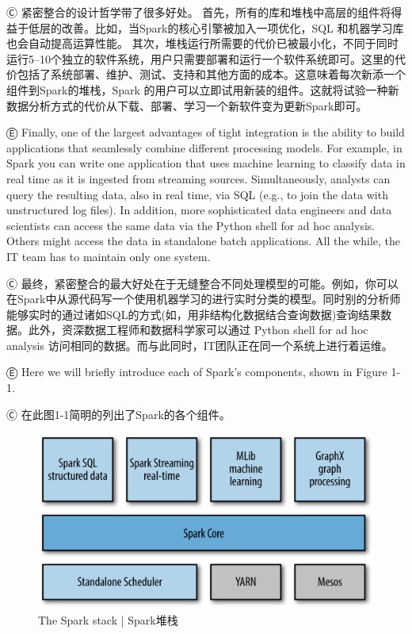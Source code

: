 Ⓒ 紧密整合的设计哲学带了很多好处。 首先，所有的库和堆栈中高层的组件将得益于低层的改善。比如，当Spark的核心引擎被加入一项优化，SQL 和机器学习库也会自动提高运算性能。 其次，堆栈运行所需要的代价已被最小化，不同于同时运行5--10个独立的软件系统，用户只需要部署和运行一个软件系统即可。这里的代价包括了系统部署、维护、测试、支持和其他方面的成本。这意味着每次新添一个组件到Spark的堆栈，Spark 的用户可以立即试用新装的组件。这就将试验一种新数据分析方式的代价从下载、部署、学习一个新软件变为更新Spark即可。

Ⓔ \textcolor{etc} {Finally, one of the largest advantages of tight integration is the ability to build applications that seamlessly combine different
processing models. For example, in Spark you can write one application that uses machine learning to classify data in real time as it is
ingested from streaming sources. Simultaneously, analysts can query the resulting data, also in real time, via SQL (e.g., to join the data with
unstructured log files). In addition, more sophisticated data engineers and data scientists can access the same data via the Python shell for ad
hoc analysis. Others might access the data in standalone batch applications. All the while, the IT team has to maintain only one system.}

Ⓒ 最终，紧密整合的最大好处在于无缝整合不同处理模型的可能。例如，你可以在Spark中从源代码写一个使用机器学习的进行实时分类的模型。同时别的分析师能够实时的通过诸如SQL的方式(如，用非结构化数据结合查询数据)查询结果数据。此外，资深数据工程师和数据科学家可以通过 Python shell for ad hoc analysis 访问相同的数据。而与此同时，IT团队正在同一个系统上进行着运维。

Ⓔ \textcolor{etc}{Here we will briefly introduce each of Spark's components, shown in Figure 1-1.}

Ⓒ 在此图1-1简明的列出了Spark的各个组件。

\begin{figure}[htbp]
\centering
\includegraphics[width=.6\textwidth]{../images/fig_1-1.png}
\caption{The Spark stack  |  Spark堆栈}
\end{figure}

